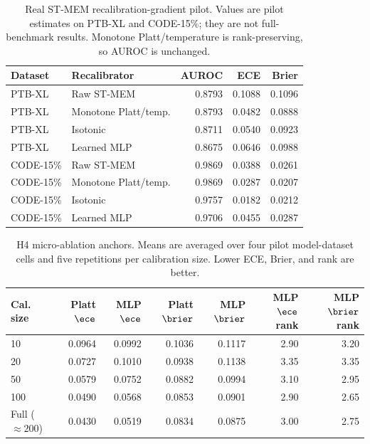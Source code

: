 \begin{table}[t]
\centering
\caption{Real ST-MEM recalibration-gradient pilot. Values are pilot estimates on PTB-XL and CODE-15\%; they are not full-benchmark results. Monotone Platt/temperature is rank-preserving, so AUROC is unchanged.}
\label{tab:real-gradient}
\begin{tabular}{llrrr}
\toprule
Dataset & Recalibrator & AUROC & ECE & Brier \\
\midrule
PTB-XL & Raw ST-MEM & 0.8793 & 0.1088 & 0.1096 \\
PTB-XL & Monotone Platt/temp. & 0.8793 & 0.0482 & 0.0888 \\
PTB-XL & Isotonic & 0.8711 & 0.0540 & 0.0923 \\
PTB-XL & Learned MLP & 0.8675 & 0.0646 & 0.0988 \\
CODE-15\% & Raw ST-MEM & 0.9869 & 0.0388 & 0.0261 \\
CODE-15\% & Monotone Platt/temp. & 0.9869 & 0.0287 & 0.0207 \\
CODE-15\% & Isotonic & 0.9757 & 0.0182 & 0.0212 \\
CODE-15\% & Learned MLP & 0.9706 & 0.0455 & 0.0287 \\
\bottomrule
\end{tabular}
\end{table}

\begin{table}[t]
\centering
\caption{H4 micro-ablation anchors. Means are averaged over four pilot model-dataset cells and five repetitions per calibration size. Lower ECE, Brier, and rank are better.}
\label{tab:h4-anchors}
\begingroup
\small
\setlength{\tabcolsep}{4pt}
\begin{tabular}{lrrrrrr}
\toprule
Cal. size & Platt $\ece$ & MLP $\ece$ & Platt $\brier$ & MLP $\brier$ & MLP $\ece$ rank & MLP $\brier$ rank \\
\midrule
10 & 0.0964 & 0.0992 & 0.1036 & 0.1117 & 2.90 & 3.20 \\
20 & 0.0727 & 0.1010 & 0.0938 & 0.1138 & 3.35 & 3.35 \\
50 & 0.0579 & 0.0752 & 0.0882 & 0.0994 & 3.10 & 2.95 \\
100 & 0.0490 & 0.0568 & 0.0853 & 0.0901 & 2.90 & 2.65 \\
Full ($\approx 200$) & 0.0430 & 0.0519 & 0.0834 & 0.0875 & 3.00 & 2.75 \\
\bottomrule
\end{tabular}
\endgroup
\end{table}

